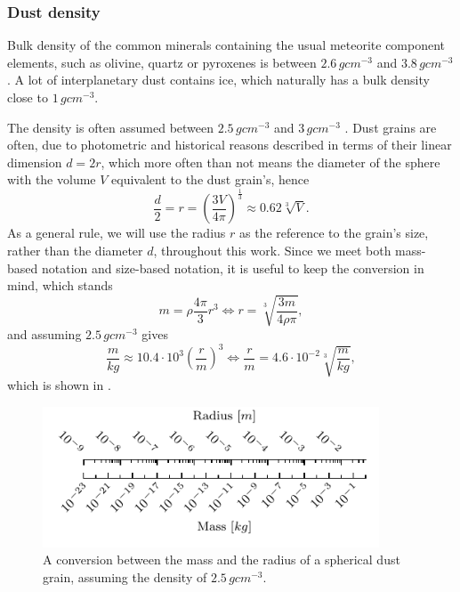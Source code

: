 \subsubsection{Dust density} \label{sec:density}

Bulk density of the common minerals containing the usual meteorite component elements, such as olivine, quartz or pyroxenes is between $2.6 \, \si{g cm^{-3}}$ and $3.8 \, \si{g cm^{-3}}$ \citep{duda1986minerals}. A lot of interplanetary dust contains ice, which naturally has a bulk density close to $1 \, \si{g cm^{-3}}$.

The density is often assumed between $2.5 \, \si{g cm^{-3}}$ \citep{mann2014dust} and $3 \, \si{g cm^{-3}}$ \citep{mcdonnell1984cosmic}. Dust grains are often, due to photometric and historical reasons described in terms of their linear dimension $d = 2r$, which more often than not means the diameter of the sphere with the volume $V$ equivalent to the dust grain's, hence
\begin{equation}
    \frac{d}{2} = r = \left( {\frac{3V}{4\pi}} \right)^{\frac{1}{3}} \approx 0.62 \sqrt[3]{V}.
\end{equation}
As a general rule, we will use the radius $r$ as the reference to the grain's size, rather than the diameter $d$, throughout this work. Since we meet both mass-based notation and size-based notation, it is useful to keep the conversion in mind, which stands
\begin{equation}
    m = \rho \frac{4\pi}{3} r^3 \Leftrightarrow r = \sqrt[3]{\frac{3 m}{4 \rho \pi}},
    \label{eq:density}
\end{equation}
and assuming $2.5 \, \si{g cm^{-3}}$ gives
\begin{equation}
    \frac{m}{\si{kg}} \approx 10.4 \cdot 10^3 \left(\frac{r}{\si{m}}\right)^3 
\Leftrightarrow 
    \frac{r}{\si{m}} = 4.6 \cdot 10^{-2} \sqrt[3]{\frac{m}{\si{kg}}},
\end{equation}
which is shown in .

\begin{figure}[h]
 	\centering
 	\includegraphics[width=10cm]{figures/mass_size_ruler.pdf}
 	\caption{A conversion between the mass and the radius of a spherical dust grain, assuming the density of $2.5 \, \si{g cm^{-3}}$.}
 	\label{fig:mass_size_ruler}
\end{figure}

